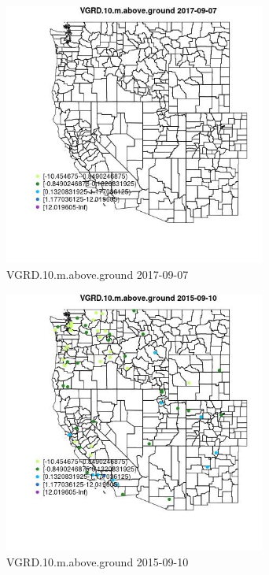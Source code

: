 \begin{figure} 
\centering  
\includegraphics[width=0.77\textwidth]{Code_Outputs/Report_ML_input_PM25_Step4_part_e_de_duplicated_aveswNAs_MapObsVGRD10maboveground2017-09-07.jpg} 
\caption{\label{fig:Report_ML_input_PM25_Step4_part_e_de_duplicated_aveswNAsMapObsVGRD10maboveground2017-09-07}VGRD.10.m.above.ground 2017-09-07} 
\end{figure} 
 

\begin{figure} 
\centering  
\includegraphics[width=0.77\textwidth]{Code_Outputs/Report_ML_input_PM25_Step4_part_e_de_duplicated_aveswNAs_MapObsVGRD10maboveground2015-09-10.jpg} 
\caption{\label{fig:Report_ML_input_PM25_Step4_part_e_de_duplicated_aveswNAsMapObsVGRD10maboveground2015-09-10}VGRD.10.m.above.ground 2015-09-10} 
\end{figure} 
 

